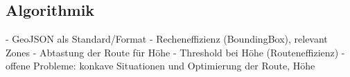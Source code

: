 \subsection*{Algorithmik}
- GeoJSON als Standard/Format
- Recheneffizienz (BoundingBox), relevant Zones
- Abtastung der Route für Höhe
- Threshold bei Höhe (Routeneffizienz)
- offene Probleme: konkave Situationen und Optimierung der Route, Höhe
